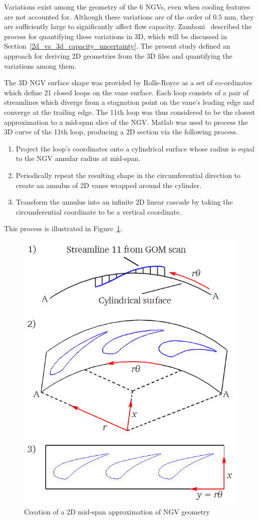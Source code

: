 \documentclass[a4paper, 11pt, oneside]{report}
\begin{document}
Variations exist among the geometry of the 6 NGVs, even when cooling features are not accounted for. Although these variations are of the order of $0.5$ mm, they are sufficiently large to significantly affect flow capacity. Zamboni~\cite{zamboni_area} described the process for quantifying these variations in 3D, which will be discussed in Section~\ref{2d_vs_3d_capacity_uncertainty}. The present study defined an approach for deriving 2D geometries from the 3D files and quantifying the variations among them.

The 3D NGV surface shape was provided by Rolls-Royce as a set of co-ordinates which define 21 closed loops on the vane surface. Each loop consists of a pair of streamlines which diverge from a stagnation point on the vane's leading edge and converge at the trailing edge. The 11th loop was thus considered to be the closest approximation to a mid-span slice of the NGV. Matlab was used to process the 3D curve of the 11th loop, producing a 2D section via the following process. 
\begin{enumerate}
  \item Project the loop's coordinates onto a cylindrical surface whose radius is equal to the NGV annular radius at mid-span.
  \item Periodically repeat the resulting shape in the circumferential direction to create an annulus of 2D vanes wrapped around the cylinder.
  \item Transform the annulus into an infinite 2D linear cascade by taking the circumferential coordinate to be a vertical coordinate.
\end{enumerate}
This process is illustrated in Figure~\ref{fig:2d_geometry_creation}.

\begin{figure}[H]
	\centering
	\includegraphics[width=.6\textwidth]{figs/2d_geometry_creation.png}
	\caption{Creation of a 2D mid-span approximation of NGV geometry}
	\label{fig:2d_geometry_creation}
\end{figure}
\end{document}
